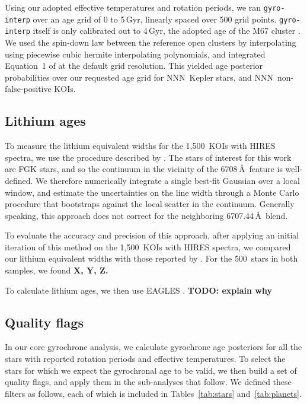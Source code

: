 \documentclass[11pt,twocolumn,tighten]{aastex63}
\newcommand{\nkoiswithhires}{{1{,}500}}
\newcommand{\nbergeroverlap}{{500}}
\newcommand{\nkepstarswithages}{NNN}
\newcommand{\nkoisnofpwithages}{NNN}
\begin{document}
Using our adopted effective temperatures and rotation periods, we ran 
\texttt{gyro-interp} over an age grid of 0 to 5\,Gyr, linearly spaced
over 500 grid points.
\texttt{gyro-interp} itself is only calibrated out to 4\,Gyr, the
adopted age of the M67 cluster \citep[see][]{Dungee_2022,Gruner_2023}.
We used the spin-down law between the reference open clusters by
interpolating using piecewise cubic hermite interpolating polynomials,
and integrated Equation~1 of \citep{Bouma_2023} at the default grid
resolution.
This yielded age posterior probabilities over our requested age grid
for \nkepstarswithages\ Kepler stars, and \nkoisnofpwithages\
non-false-positive KOIs.


\subsection{Lithium ages}
To measure the lithium equivalent widths for the \nkoiswithhires\ KOIs
with HIRES spectra, we use the procedure described by
\citet{Bouma_2021}.
The stars of interest for this work are FGK stars, and so the
continuum in the vicinity of the
 6708\,\AA\ feature is well-defined.
We therefore numerically integrate a single best-fit Gaussian over a
local window, and estimate the uncertainties on the line width through
a Monte Carlo procedure that bootstraps against the local scatter in the
continuum.
Generally speaking, this approach does not correct for the neighboring
\ion{Fe}{1} 6707.44\,\AA\ blend.

To evaluate the accuracy and precision of this approach, after
applying an initial iteration of this method on the \nkoiswithhires\
KOIs with HIRES spectra, we compared our lithium equivalent widths
with those reported by \citet{Berger_2018}.
For the \nbergeroverlap\ stars in both samples, 
we found {\bf X, Y, Z.}

To calculate lithium ages, we then use EAGLES \citep{Jeffries_2023}.
{\bf TODO: explain why}



\subsection{Quality flags}
In our core gyrochrone analysis, we calculate gyrochrone age
posteriors for all the stars with reported rotation periods and
effective temperatures.  To select the stars for which we expect the
gyrochronal age to be valid, we then build a set of quality flags, and
apply them in the sub-analyses that follow.  We defined these filters
as follows, each of which is included in Tables~\ref{tab:stars}
and~\ref{tab:planets}.
\end{document}
